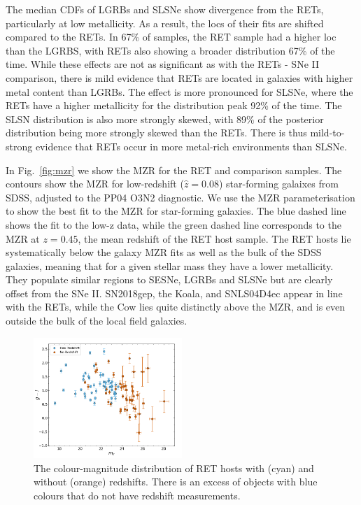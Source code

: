 \documentclass[fleqn,usenatbib,]{mnras}
\begin{document}
The median CDFs of LGRBs and SLSNe show divergence from the RETs, particularly at low metallicity. As a result, the locs of their fits are shifted compared to the RETs. In 67\% of samples, the RET sample had a higher loc than the LGRBS, with RETs also showing a broader distribution 67\% of the time. While these effects are not as significant as with the RETs - SNe II comparison, there is mild evidence that RETs are located in galaxies with higher metal content than LGRBs. The effect is more pronounced for SLSNe, where the RETs have a higher metallicity for the distribution peak 92\% of the time. The SLSN distribution is also more strongly skewed, with 89\% of the posterior distribution being more strongly skewed than the RETs. There is thus mild-to-strong evidence that RETs occur in more metal-rich environments than SLSNe. 

In Fig.~\ref{fig:mzr} we show the MZR for the RET and comparison samples. The contours show the MZR for low-redshift ($\hat{z}=0.08$) star-forming galaixes from SDSS, adjusted to the PP04 O3N2 diagnostic. We use the MZR parameterisation \citet{Zahid2014} to show the best fit to the MZR for star-forming galaxies. The blue dashed line shows the fit to the low-z data, while the green dashed line corresponds to the MZR at $z=0.45$, the mean redshift of the RET host sample. The RET hosts lie systematically below the galaxy MZR fits as well as the bulk of the SDSS galaxies, meaning that for a given stellar mass they have a lower metallicity. They populate similar regions to SESNe, LGRBs and SLSNe but are clearly offset from the SNe II. SN2018gep, the Koala, and SNLS04D4ec appear in line with the RETs, while the Cow lies quite distinctly above the MZR, and is even outside the bulk of the local field galaxies.

\begin{figure}
\includegraphics[width=0.5\textwidth]{figs/mag_v_colour.png}
\caption{The colour-magnitude distribution of RET hosts with (cyan) and without (orange) redshifts. There is an excess of objects with blue colours that do not have redshift measurements.
\label{fig:g-i}}
\end{figure}
\end{document}
